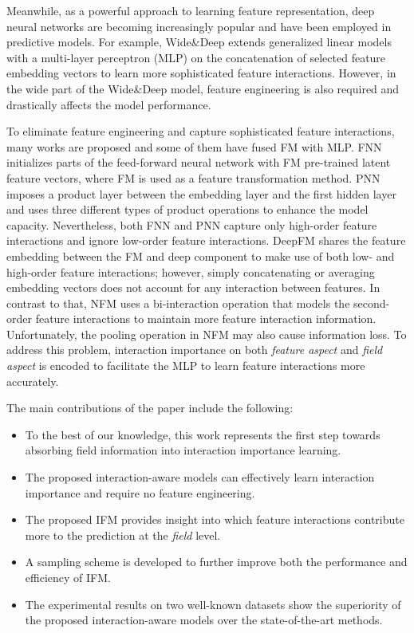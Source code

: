 \documentclass[letterpaper]{article} \usepackage{aaai19}  \usepackage{times}  \usepackage{helvet}  \usepackage{courier}  \usepackage{url}  \usepackage{graphicx}  \frenchspacing  \setlength{\pdfpagewidth}{8.5in}  \setlength{\pdfpageheight}{11in}  \usepackage{mathtools}
\begin{document}
Meanwhile, as a powerful approach to learning feature representation, deep neural networks are becoming increasingly popular and have been employed in predictive models. For example, Wide\&Deep\cite{cheng2016wide} extends generalized linear models with a multi-layer perceptron (MLP) on the concatenation of selected feature embedding vectors to learn more sophisticated feature interactions. However, in the wide part of the Wide\&Deep model, feature engineering is also required and drastically affects the model performance. 

To eliminate feature engineering and capture sophisticated feature interactions, many works\cite{cao2016multi,wang2017deep} are proposed and some of them have fused FM with MLP. FNN\cite{zhang2016deep} initializes parts of the feed-forward neural network with FM pre-trained latent feature vectors, where FM is used as a feature transformation method. PNN\cite{qu2016product} imposes a product layer between the embedding layer and the first hidden layer and uses three different types of product operations to enhance the model capacity. Nevertheless, both FNN and PNN capture only high-order feature interactions and ignore low-order feature interactions. DeepFM\cite{guo2017deepfm} shares the feature embedding between the FM and deep component to make use of both low- and high-order feature interactions; however, simply concatenating\cite{cheng2016wide,guo2017deepfm} or averaging embedding vectors\cite{wang2015learning,chen2017attentive} does not account for any interaction between features. In contrast to that, NFM\cite{he2017neural} uses a bi-interaction operation that models the second-order feature interactions to maintain more feature interaction information. Unfortunately, the pooling operation in NFM may also cause information loss. To address this problem, interaction importance on both \emph{feature aspect} and \emph{field aspect} is encoded to facilitate the MLP to learn feature interactions more accurately.

The main contributions of the paper include the following:
\begin{itemize}
\item To the best of our knowledge, this work represents the first step towards absorbing field information into interaction importance learning.
\item The proposed interaction-aware models can effectively learn interaction importance and require no feature engineering.
\item The proposed IFM provides insight into which feature interactions contribute more to the prediction at the \emph{field} level.
\item A sampling scheme is developed to further improve both the performance and efficiency of IFM.
\item The experimental results on two well-known datasets show the superiority of the proposed interaction-aware models over the state-of-the-art methods.
\end{itemize}
\end{document}
